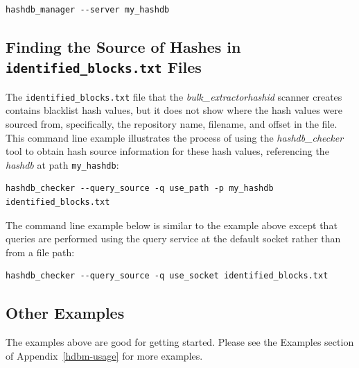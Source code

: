 \documentclass[11pt,twoside]{article}
\newcommand \bulk {\textit{bulk\_extractor}\xspace}
\newcommand \hdb {\textit{hashdb}\xspace}
\newcommand \hdbc {\textit{hashdb\_checker}\xspace}
\newcommand \hid {\textit{hashid}\xspace}
\begin{document}
\begin{small}
\begin{verbatim}
hashdb_manager --server my_hashdb
\end{verbatim}
\end{small}

\subsection{Finding the Source of Hashes in \texttt{identified\_blocks.txt} Files}
The \texttt{identified\_blocks.txt} file that the \bulk \hid scanner creates
contains blacklist hash values,
but it does not show where the hash values were sourced from,
specifically, the repository name, filename, and offset in the file.
This command line example illustrates the process of
using the \hdbc tool to obtain
hash source information for these hash values,
referencing the \hdb at path \texttt{my\_hashdb}:

\begin{small}
\begin{verbatim}
hashdb_checker --query_source -q use_path -p my_hashdb identified_blocks.txt
\end{verbatim}
\end{small}

The command line example below is similar to the example above
except that queries are performed
using the query service at the default socket rather than from a file path:

\begin{small}
\begin{verbatim}
hashdb_checker --query_source -q use_socket identified_blocks.txt
\end{verbatim}
\end{small}

\subsection{Other Examples}
The examples above are good for getting started.
Please see the Examples section of Appendix~\ref{hdbm-usage}
for more examples.
\end{document}
